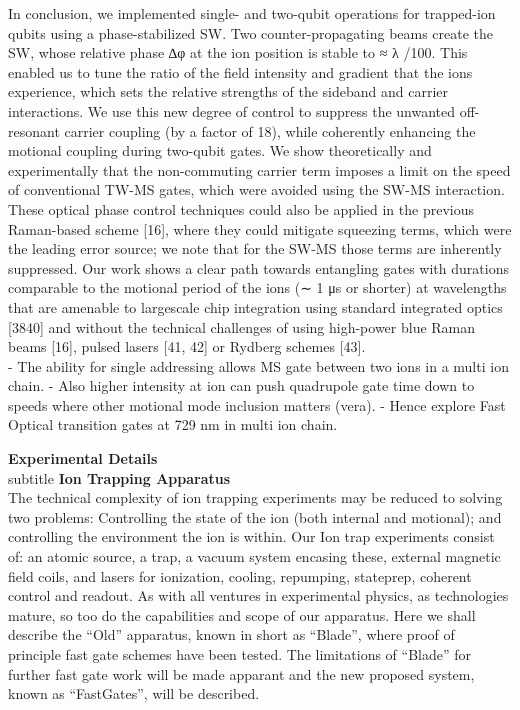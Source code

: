\documentclass{article}
\begin{document}
    In conclusion, we implemented single- and two-qubit operations for
    trapped-ion qubits using a phase-stabilized SW. Two
    counter-propagating beams create the SW, whose relative phase ∆φ at
    the ion position is stable to ≈ λ /100. This enabled us to tune the
    ratio of the field intensity and gradient that the ions experience,
    which sets the relative strengths of the sideband and carrier
    interactions. We use this new degree of control to suppress the
    unwanted off-resonant carrier coupling (by a factor of 18), while
    coherently enhancing the motional coupling during two-qubit gates. We
    show theoretically and experimentally that the non-commuting carrier
    term imposes a limit on the speed of conventional TW-MS gates, which
    were avoided using the SW-MS interaction. These optical phase control
    techniques could also be applied in the previous Raman-based scheme
    [16], where they could mitigate squeezing terms, which were the
    leading error source; we note that for the SW-MS those terms are
    inherently suppressed. Our work shows a clear path towards entangling
    gates with durations comparable to the motional period of the ions (∼
    1 μs or shorter) at wavelengths that are amenable to largescale chip
    integration using standard integrated optics [3840] and without the
    technical challenges of using high-power blue Raman beams [16], pulsed
    lasers [41, 42] or Rydberg schemes [43].\\

    - The ability for single addressing allows MS gate between two ions in a multi ion chain.
    - Also higher intensity at ion can push quadrupole gate time down to speeds where other motional mode inclusion matters (vera).
    - Hence explore Fast Optical transition gates at 729 nm in multi ion chain.
    

\textbf{Experimental Details}\\


subtitle \textbf{Ion Trapping Apparatus}\\

The technical complexity of ion trapping experiments may be reduced to
solving two problems: Controlling the state of the ion (both internal
and motional); and controlling the environment the ion is within.
Our Ion trap experiments consist of: an atomic source, a trap, a
vacuum system encasing these, external magnetic field coils, and
lasers for ionization, cooling, repumping, stateprep, coherent
control and readout.
As with all ventures in experimental physics, as technologies mature, so
too do the capabilities and scope of our apparatus.  Here we shall
describe the ``Old'' apparatus, known in short as ``Blade'', where
proof of principle fast gate schemes have been tested. The limitations
of ``Blade'' for further fast gate work will be made apparant and
the new proposed system, known as ``FastGates'', will be described. 
\end{document}
